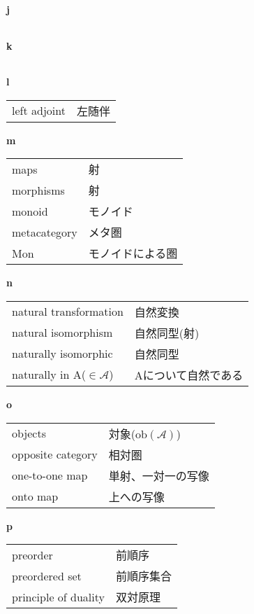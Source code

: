 \documentclass[dvipdfmx]{jsarticle}
\begin{document}
\textbf{j}

  \begin{tabular}{ll}
  \end{tabular}

\textbf{k}

  \begin{tabular}{ll}
  \end{tabular}

\textbf{l}

  \begin{tabular}{ll}
    left adjoint & 左随伴 \\
  \end{tabular}

\textbf{m}

  \begin{tabular}{ll}
    maps & 射 \\
    morphisms & 射 \\
    monoid & モノイド \\
    metacategory & メタ圏 \\
    Mon & モノイドによる圏 \\
  \end{tabular}

\textbf{n}

  \begin{tabular}{ll}
    natural transformation & 自然変換 \\
    natural isomorphism & 自然同型(射) \\
    naturally isomorphic & 自然同型 \\
    naturally in A($\in \mathscr{A}$) & Aについて自然である
  \end{tabular}

\textbf{o}

  \begin{tabular}{ll}
    objects & 対象($\mathrm{ob}(\mathscr{A})$) \\
    opposite category & 相対圏 \\
    one-to-one map & 単射、一対一の写像 \\
    onto map & 上への写像 \\
  \end{tabular}

\textbf{p}

  \begin{tabular}{ll}
    preorder & 前順序 \\
    preordered set & 前順序集合 \\
    principle of duality & 双対原理 \\
  \end{tabular}
\end{document}
